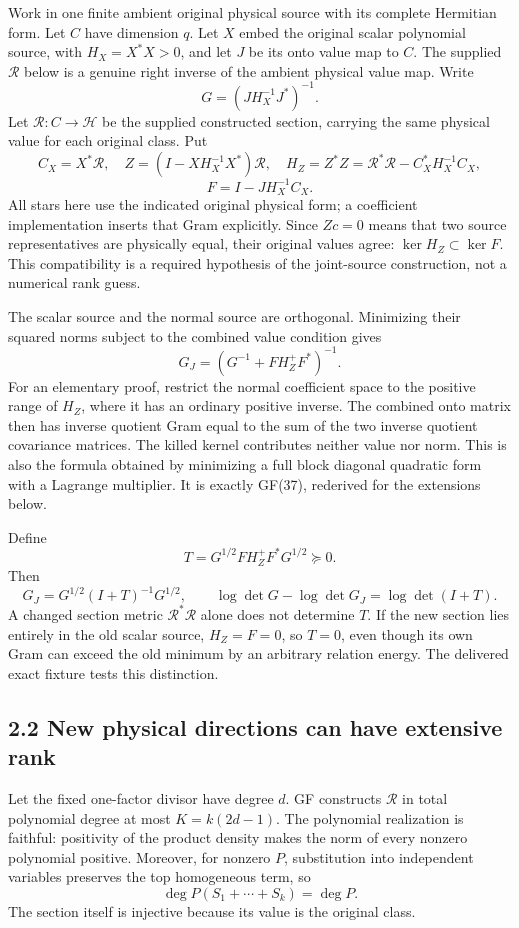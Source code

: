 \documentclass[
  11pt,
]{article}
\begin{document}
Work in one finite ambient original physical source with its complete
Hermitian form. Let \(C\) have dimension \(q\). Let \(X\) embed the
original scalar polynomial source, with \(H_X=X^*X>0\), and let \(J\) be
its onto value map to \(C\). The supplied \(\mathcal R\) below is a
genuine right inverse of the ambient physical value map. Write \[
G=(JH_X^{-1}J^*)^{-1}.
\] Let \(\mathcal R:C\to\mathscr H\) be the supplied constructed
section, carrying the same physical value for each original class. Put
\[
C_X=X^*\mathcal R,\quad Z=(I-XH_X^{-1}X^*)\mathcal R,
\quad H_Z=Z^*Z=\mathcal R^*\mathcal R-C_X^*H_X^{-1}C_X,
\] \[
F=I-JH_X^{-1}C_X. \tag{JS1}
\] All stars here use the indicated original physical form; a
coefficient implementation inserts that Gram explicitly. Since \(Zc=0\)
means that two source representatives are physically equal, their
original values agree: \(\ker H_Z\subset\ker F\). This compatibility is
a required hypothesis of the joint-source construction, not a numerical
rank guess.

The scalar source and the normal source are orthogonal. Minimizing their
squared norms subject to the combined value condition gives \[
G_J=(G^{-1}+F H_Z^+F^*)^{-1}.
\tag{JS2}
\] For an elementary proof, restrict the normal coefficient space to the
positive range of \(H_Z\), where it has an ordinary positive inverse.
The combined onto matrix then has inverse quotient Gram equal to the sum
of the two inverse quotient covariance matrices. The killed kernel
contributes neither value nor norm. This is also the formula obtained by
minimizing a full block diagonal quadratic form with a Lagrange
multiplier. It is exactly GF(37), rederived for the extensions below.

Define \[
T=G^{1/2}F H_Z^+F^*G^{1/2}\succeq0.
\] Then \[
\boxed{G_J=G^{1/2}(I+T)^{-1}G^{1/2},\qquad
\log\det G-\log\det G_J=\log\det(I+T).} \tag{JS3}
\] A changed section metric \(\mathcal R^*\mathcal R\) alone does not
determine \(T\). If the new section lies entirely in the old scalar
source, \(H_Z=F=0\), so \(T=0\), even though its own Gram can exceed the
old minimum by an arbitrary relation energy. The delivered exact fixture
tests this distinction.

\subsection{2.2 New physical directions can have extensive
rank}\label{new-physical-directions-can-have-extensive-rank}

Let the fixed one-factor divisor have degree \(d\). GF constructs
\(\mathcal R\) in total polynomial degree at most \(K=k(2d-1)\). The
polynomial realization is faithful: positivity of the product density
makes the norm of every nonzero polynomial positive. Moreover, for
nonzero \(P\), substitution into independent variables preserves the top
homogeneous term, so \[
\deg P(S_1+\cdots+S_k)=\deg P.
\] The section itself is injective because its value is the original
class.
\end{document}
